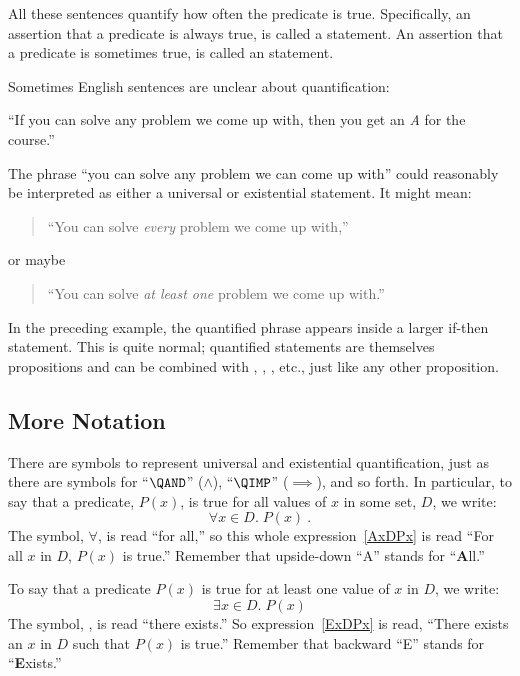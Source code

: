 All these sentences quantify how often the predicate is true.
Specifically, an assertion that a predicate is always true, is called
a  statement.  An assertion that a
predicate is sometimes true, is called an  statement.

Sometimes English sentences are unclear about quantification:
%
\begin{center}
  ``If you can solve any problem we come up with, then you get an \emph{A}
  for the course.''
\end{center}
%
The phrase ``you can solve any problem we can come up with'' could
reasonably be interpreted as either a universal or existential
statement.  It might mean:
%
\begin{quote}
``You can solve \emph{every} problem we come up with,''
\end{quote}
or maybe
\begin{quote}
``You can solve \emph{at least one} problem we come up with.''
\end{quote}

In the preceding example, the quantified phrase appears inside a
larger if-then statement.  This is quite normal; quantified statements
are themselves propositions and can be combined with \QAND, \QOR,
\QIMPLIES, etc., just like any other proposition.

\subsection{More Notation}

There are symbols to represent universal and existential
quantification, just as there are symbols for ``$\QAND$'' ($\wedge$),
``$\QIMP$'' ($\implies$), and so forth.  In particular, to say
that a predicate, $P(x)$, is true for all values of $x$ in some set,
$D$, we write:
\begin{equation}\label{AxDPx}
\forall x \in D.\; P(x)\ .
\end{equation}
The  symbol, $\forall$, is read ``for all,''
so this whole expression~\eqref{AxDPx} is read ``For all $x$ in $D$,
$P(x)$ is true.''  Remember that upside-down ``A'' stands for
``\textbf{A}ll.''

To say that a predicate $P(x)$ is true for at least one value of $x$
in $D$, we write:
\begin{equation}\label{ExDPx}
\exists x \in D.\; P(x)
\end{equation}
The  symbol, \term{$\exists$}, is read
``there exists.''  So expression~\eqref{ExDPx} is read, ``There exists
an $x$ in $D$ such that $P(x)$ is true.''  Remember that backward
``E'' stands for ``\textbf{E}xists.''

